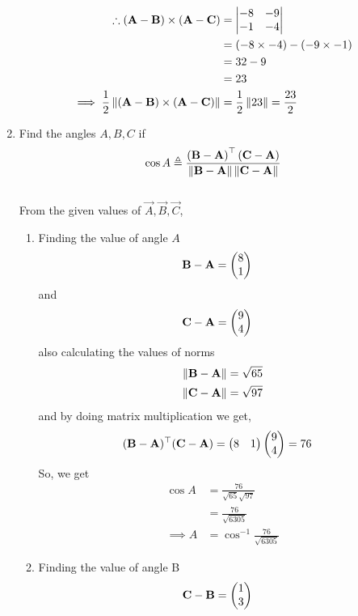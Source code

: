 \documentclass[10pt]{book}
\begin{document}
\begin{enumerate}[label=\thesection.\arabic*.,ref=\thesection.\theenumi]
\begin{align}
\therefore(\mathbf{A}-\mathbf{B})\times(\mathbf{A}-\mathbf{C}) 
 &= \begin{vmatrix}-8 & -9\\-1 & -4\end{vmatrix}\\
 &= \left(-8 \times -4\right) - \left(-9 \times -1\right)\\ &= 32 - 9\\ &= 23\\
 \implies\frac{1}{2}\left\lVert(\mathbf{A}-\mathbf{B})\times(\mathbf{A}-\mathbf{C})\right\rVert &= \frac{1}{2}\left\lVert23\right\rVert= \frac{23}{2}
\end{align}
\item Find the angles $A, B, C$ if
    \label{prop:angle2d}
    \begin{align}
    \label{eq:angle2d}
    \cos A \triangleq
\frac{\brak{\vec{B}-\vec{A}}^{\top}\brak{{\vec{C}-\vec{A}}}}{\norm{\vec{B}-\vec{A}}\norm{\vec{C}-\vec{A}}}
\end{align}
\solution\\
From the given values of $\vec{A},\vec{B},\vec{C}$,\\
\begin{enumerate}
 \item Finding the value of angle $A$
\begin{align}
 \mathbf{B}-\mathbf{A} &=\begin{pmatrix}8\\1\end{pmatrix}
\end{align}
and 
\begin{align}
 \mathbf{C}-\mathbf{A} &= \begin{pmatrix}9\\4\end{pmatrix}
\end{align}
also calculating the values of norms
\begin{align}
 \left\lVert\mathbf{B}-\mathbf{A}\right\rVert &= \sqrt{65}\\
 \left\lVert\mathbf{C}-\mathbf{A}\right\rVert &= \sqrt{97}
\end{align}
and by doing matrix multiplication we get,
\begin{align}
\begin{split}
 (\mathbf{B}-\mathbf{A})^{\top}(\mathbf{C}-\mathbf{A}) &= \begin{pmatrix}8&1\end{pmatrix}\begin{pmatrix}9\\4\end{pmatrix} = 76
\end{split}
\end{align}
So, we get
\begin{align}
 \cos{A} &= \frac{76}{\sqrt{65} \sqrt{97}}\\
 &= \frac{76}{\sqrt{6305}}\\
 \implies A& = \cos^{-1}{\frac{76}{\sqrt{6305}}}
\end{align}
\item Finding the value of angle B
\begin{align}
 \vec{C}-\vec{B} &=\myvec{ 1\\3}

\end{align}
\end{enumerate}
\end{enumerate}
\end{document}
